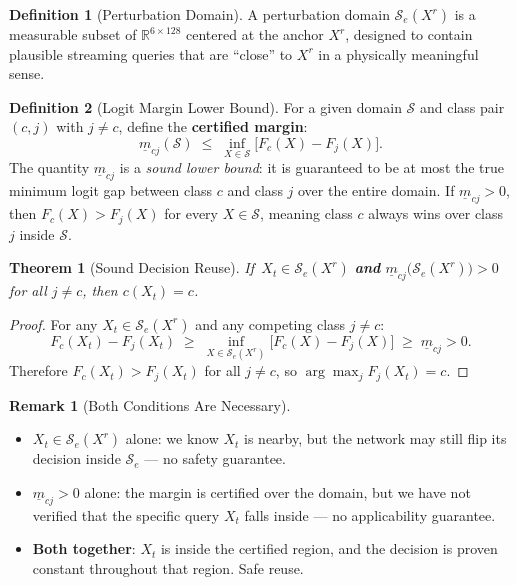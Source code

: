 \documentclass[11pt, a4paper]{article}
\theoremstyle{definition}
\newtheorem{definition}{Definition}[section]
\newtheorem{remark}{Remark}[section]
\theoremstyle{plain}
\newtheorem{theorem}{Theorem}[section]
\newcommand{\R}{\mathbb{R}}
\newcommand{\Se}{\mathcal{S}_e}
\begin{document}
\begin{definition}[Perturbation Domain]
  A perturbation domain $\Se(X^r)$ is a measurable subset of $\R^{6\times128}$
  centered at the anchor $X^r$, designed to contain plausible streaming queries
  that are ``close'' to $X^r$ in a physically meaningful sense.
\end{definition}

\begin{definition}[Logit Margin Lower Bound]
  For a given domain $\mathcal{S}$ and class pair $(c, j)$ with $j \ne c$, define
  the \textbf{certified margin}:
  \begin{equation}
    \underline{m}_{cj}(\mathcal{S})
    \;\le\; \inf_{X \in \mathcal{S}} \bigl[F_c(X) - F_j(X)\bigr].
  \end{equation}
  The quantity $\underline{m}_{cj}$ is a \emph{sound lower bound}: it is guaranteed
  to be at most the true minimum logit gap between class $c$ and class $j$ over the
  entire domain. If $\underline{m}_{cj} > 0$, then $F_c(X) > F_j(X)$ for every
  $X \in \mathcal{S}$, meaning class $c$ always wins over class $j$ inside $\mathcal{S}$.
\end{definition}

\begin{theorem}[Sound Decision Reuse]
  If\,
  $X_t \in \Se(X^r)$
  \;\textbf{and}\;
  $\underline{m}_{cj}\bigl(\Se(X^r)\bigr) > 0$ for all $j \ne c$,
  \;then $c(X_t) = c$.
\end{theorem}

\begin{proof}
  For any $X_t \in \Se(X^r)$ and any competing class $j \ne c$:
  \[
    F_c(X_t) - F_j(X_t)
    \;\ge\; \inf_{X \in \Se(X^r)}\bigl[F_c(X) - F_j(X)\bigr]
    \;\ge\; \underline{m}_{cj} > 0.
  \]
  Therefore $F_c(X_t) > F_j(X_t)$ for all $j \ne c$, so $\arg\max_j F_j(X_t) = c$.
\end{proof}

\begin{remark}[Both Conditions Are Necessary]
  \begin{itemize}[leftmargin=1.5em]
    \item $X_t \in \Se(X^r)$ alone: we know $X_t$ is nearby, but the network may
          still flip its decision inside $\Se$ — no safety guarantee.
    \item $\underline{m}_{cj} > 0$ alone: the margin is certified over the domain,
          but we have not verified that the specific query $X_t$ falls inside — no
          applicability guarantee.
    \item \textbf{Both together}: $X_t$ is inside the certified region, and the
          decision is proven constant throughout that region. Safe reuse.
  \end{itemize}
\end{remark}
\end{document}
